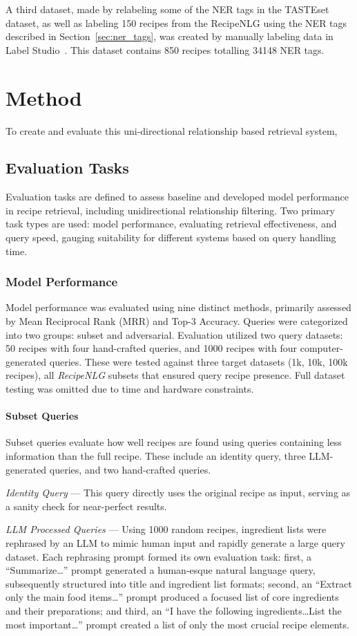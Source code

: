 \documentclass[11pt]{article}
\begin{document}
A third dataset, made by relabeling some of the NER tags in the TASTEset dataset,
as well as labeling 150 recipes from the RecipeNLG using the NER tags
described in Section~\ref{sec:ner_tags}, was created by manually labeling
data in Label Studio~\cite{LabelStudio}.
This dataset contains 850 recipes totalling 34148 NER tags.

\section{Method}
To create and evaluate this uni-directional relationship based retrieval system, 

\subsection{Evaluation Tasks}
Evaluation tasks are defined to assess baseline and developed model performance
in recipe retrieval, including unidirectional relationship filtering.
Two primary task types are used: model performance, evaluating retrieval
effectiveness, and query speed, gauging suitability for different systems based
on query handling time.

\subsubsection{Model Performance}\label{sec:modelperfomance}
Model performance was evaluated using nine distinct methods, primarily assessed
by Mean Reciprocal Rank (MRR) and Top-3 Accuracy.
Queries were categorized into two groups: subset and adversarial.
Evaluation utilized two query datasets: 50 recipes with four hand-crafted
queries, and 1000 recipes with four computer-generated queries.
These were tested against three target datasets (1k, 10k, 100k recipes), all
\emph{RecipeNLG} subsets that ensured query recipe presence.
Full dataset testing was omitted due to time and hardware constraints.
\paragraph{Subset Queries}
Subset queries evaluate how well recipes are found using queries containing less
information than the full recipe.
These include an identity query, three LLM-generated queries, and two
hand-crafted queries.

\emph{Identity Query} --- This query directly uses the original recipe as input,
serving as a sanity check for near-perfect results.

\emph{LLM Processed Queries} --- Using 1000 random recipes, ingredient lists
were rephrased by an LLM to mimic human input and rapidly generate a large query
dataset.
Each rephrasing prompt formed its own evaluation task: first, a
``Summarize\ldots'' prompt generated a human-esque natural language query,
subsequently structured into title and ingredient list formats; second, an
``Extract only the main food items\ldots'' prompt produced a focused list of
core ingredients and their preparations; and third, an ``I have the following
ingredients\ldots List the most important\ldots'' prompt created a list of only
the most crucial recipe elements.  
\end{document}

